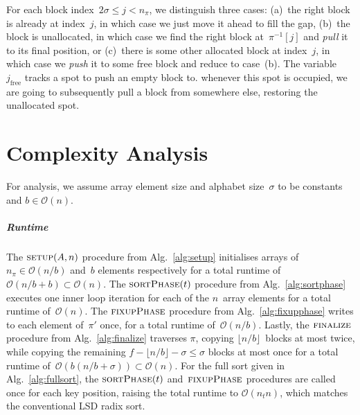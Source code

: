 \documentclass[nolineno,a4paper,UKenglish,cleveref, autoref, thm-restate]{socg-lipics-v2021}
\begin{document}
For each block index~$2\sigma\le j<n_\pi$, we
distinguish three cases: (a)~the right block is already at index~$j$, in which case we
just move it ahead to fill the gap,  (b)~the block is unallocated, in which case we find the
right block at~$\pi^{-1}[j]$ and \emph{pull} it to its final position, or (c)~there is some other
allocated block at index~$j$, in which case we \emph{push} it to some free block and reduce to
case~(b).  The variable~$j_{\mathrm{free}}$ tracks a spot to push an empty block to.
whenever this spot is occupied, we are going to subsequently pull a block from
somewhere else, restoring the unallocated spot.


\section{Complexity Analysis} \label{sec:analysis}
For analysis, we assume array element size and alphabet size~$\sigma$ to be
constants and $b\in\mathcal O(n)$.

\subparagraph*{Runtime}
The $\Call{setup}{A,n}$ procedure from Alg.~\ref{alg:setup} initialises
arrays of $n_\pi\in\mathcal O(n/b)$ and~$b$ elements respectively for a
total runtime of~$\mathcal O(n/b+b)\subset\mathcal O(n)$.
The $\Call{sortPhase}{t}$ procedure from Alg.~\ref{alg:sortphase} executes
one inner loop iteration for each of the $n$~array elements for a
total runtime of~$\mathcal O(n)$.
The $\Call{fixupPhase}{}$ procedure from Alg.~\ref{alg:fixupphase}
writes to each element of~$\pi'$ once, for a total runtime of~$\mathcal O(n/b)$.
Lastly, the $\Call{finalize}{}$ procedure from Alg.~\ref{alg:finalize}
traverses $\pi$, copying $\lfloor n/b\rfloor$~blocks at most twice,
while copying the remaining $f-\lfloor n/b\rfloor-\sigma\le\sigma$ blocks
at most once for a total runtime of~$\mathcal O(b(n/b+\sigma))\subset\mathcal O(n)$.
For the full sort given in Alg.~\ref{alg:fullsort}, the $\Call{sortPhase}{t}$
and~$\Call{fixupPhase}{}$ procedures are called once for each key position,
raising the total runtime to $\mathcal O(n_t n)$, which matches the conventional
LSD radix sort.
\end{document}
